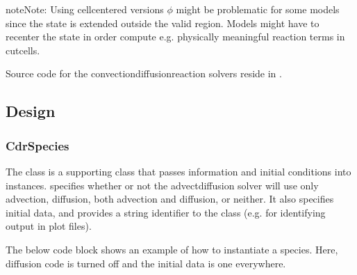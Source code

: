 \documentclass[letterpaper,10pt,english]{sphinxmanual}
\begin{document}
\begin{sphinxadmonition}{note}{Note:}
Using cell\sphinxhyphen{}centered versions \(\phi\) might be problematic for some models since the state is extended outside the valid region.
Models might have to recenter the state in order compute e.g. physically meaningful reaction terms in cut\sphinxhyphen{}cells.
\end{sphinxadmonition}

Source code for the convection\sphinxhyphen{}diffusion\sphinxhyphen{}reaction solvers reside in .


\subsection{Design}
\label{\detokenize{Solvers/CDR:design}}\label{\detokenize{Solvers/CDR:chap-cdrsolver}}

\subsubsection{CdrSpecies}
\label{\detokenize{Solvers/CDR:cdrspecies}}\label{\detokenize{Solvers/CDR:chap-cdrspecies}}
The  class is a supporting class that passes information and initial conditions into  instances.
 specifies whether or not the advect\sphinxhyphen{}diffusion solver will use only advection, diffusion, both advection and diffusion, or neither.
It also specifies initial data, and provides a string identifier to the class (e.g. for identifying output in plot files).

The below code block shows an example of how to instantiate a species.
Here, diffusion code is turned off and the initial data is one everywhere.

\begin{sphinxVerbatim}[commandchars=\\\{\},formatcom=\scriptsize]
    

           
        
             

     

            
       
\end{sphinxVerbatim}
\end{document}
